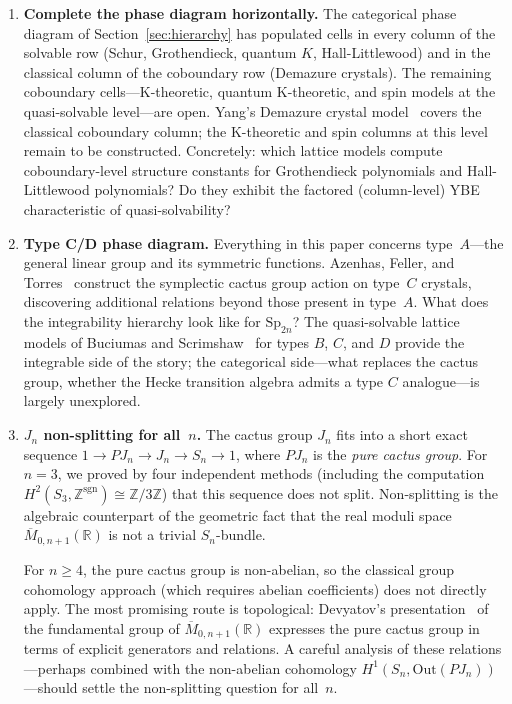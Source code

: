 \begin{enumerate}[label=\textbf{Q\arabic*.}, ref=Q\arabic*, leftmargin=3em]

\item \label{q:horizontal}
\textbf{Complete the phase diagram horizontally.}
The categorical phase diagram of Section~\ref{sec:hierarchy} has
populated cells in every column of the solvable row (Schur,
Grothendieck, quantum $K$, Hall-Littlewood) and in the classical
column of the coboundary row (Demazure crystals).  The remaining
coboundary cells---K-theoretic, quantum K-theoretic, and spin models
at the quasi-solvable level---are open.  Yang's Demazure crystal
model~\cite{yang-2025} covers the classical coboundary column; the
K-theoretic and spin columns at this level remain to be constructed.
Concretely: which lattice models compute coboundary-level structure
constants for Grothendieck polynomials and Hall-Littlewood polynomials?
Do they exhibit the factored (column-level) YBE characteristic of
quasi-solvability?

\item \label{q:typeCD}
\textbf{Type C/D phase diagram.}
Everything in this paper concerns type~$A$---the general linear group
and its symmetric functions.  Azenhas, Feller, and
Torres~\cite{azenhas-feller-torres-2022} construct the symplectic
cactus group action on type~$C$ crystals, discovering additional
relations beyond those present in type~$A$.  What does the
integrability hierarchy look like for $\mathrm{Sp}_{2n}$?  The
quasi-solvable lattice models of Buciumas and
Scrimshaw~\cite{buciumas-scrimshaw} for types $B$, $C$, and $D$
provide the integrable side of the story; the categorical side---what
replaces the cactus group, whether the Hecke transition algebra
admits a type $C$ analogue---is largely unexplored.

\item \label{q:cactus-splitting}
\textbf{$J_n$ non-splitting for all~$n$.}
The cactus group $J_n$ fits into a short exact sequence
$1 \to PJ_n \to J_n \to S_n \to 1$,
where $PJ_n$ is the \emph{pure cactus group}.  For $n = 3$, we proved
by four independent methods (including the computation
$H^2(S_3, \mathbb{Z}^{\mathrm{sgn}}) \cong \mathbb{Z}/3\mathbb{Z}$)
that this sequence does not split.  Non-splitting is the algebraic
counterpart of the geometric fact that the real moduli space
$\overline{M}_{0,n+1}(\mathbb{R})$ is not a trivial $S_n$-bundle.

For $n \geq 4$, the pure cactus group is non-abelian, so the
classical group cohomology approach (which requires abelian
coefficients) does not directly apply.  The most promising route is
topological: Devyatov's presentation~\cite{devyatov-2015} of the
fundamental group of $\overline{M}_{0,n+1}(\mathbb{R})$ expresses the
pure cactus group in terms of explicit generators and relations.  A
careful analysis of these relations---perhaps combined with the
non-abelian cohomology $H^1(S_n, \mathrm{Out}(PJ_n))$---should settle
the non-splitting question for all~$n$.


\end{enumerate}
